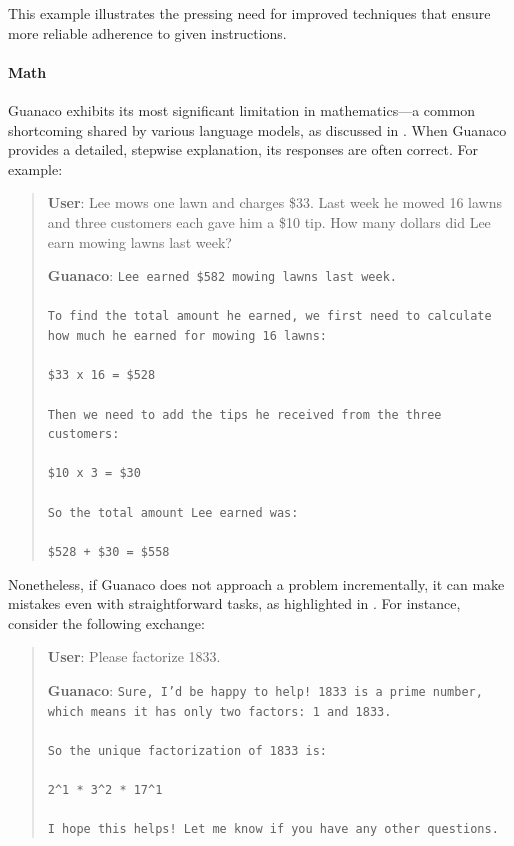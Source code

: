 This example illustrates the pressing need for improved techniques that ensure more reliable adherence to given instructions.

\paragraph{Math} {Guanaco} exhibits its most significant limitation in mathematics—a common shortcoming shared by various language models, as discussed in \citep{liang2022holistic}. When {Guanaco} provides a detailed, stepwise explanation, its responses are often correct. For example:

\begin{quote}
    \textbf{User}: Lee mows one lawn and charges \$33. Last week he mowed 16 lawns and three customers each gave him a \$10 tip. How many dollars did Lee earn mowing lawns last week?

    \textbf{Guanaco}: \texttt{Lee earned \$582 mowing lawns last week. \\ \\ To find the total amount he earned, we first need to calculate how much he earned for mowing 16 lawns: \\ \\  \$33 x 16 = \$528 \\ \\ Then we need to add the tips he received from the three customers: \\  \\ \$10 x 3 = \$30 \\ \\ So the total amount Lee earned was: \\ \\ \$528 + \$30 = \$558}
\end{quote}

Nonetheless, if {Guanaco} does not approach a problem incrementally, it can make mistakes even with straightforward tasks, as highlighted in \cite{weichain}. For instance, consider the following exchange:

\begin{quote}
    \textbf{User}: Please factorize 1833.

    \textbf{Guanaco}: \texttt{Sure, I'd be happy to help! 1833 is a prime number, which means it has only two factors: 1 and 1833. \\ \\ So the unique factorization of 1833 is: \\ \\ 2\^{}1 * 3\^{}2 * 17\^{}1 \\ \\ I hope this helps! Let me know if you have any other questions.}
\end{quote}

